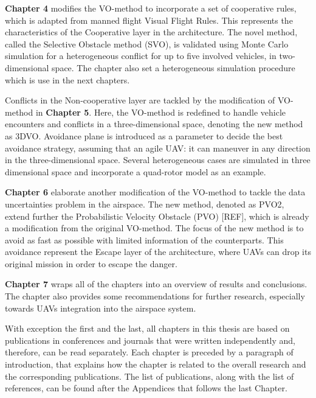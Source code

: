 \textbf{Chapter 4} modifies the VO-method to incorporate a set of cooperative rules, which is adapted from manned flight Visual Flight Rules. This represents the characteristics of the Cooperative layer in the architecture. The novel method, called the Selective Obstacle method (SVO), is validated using Monte Carlo simulation for a heterogeneous conflict for up to five involved vehicles, in two-dimensional space. The chapter also set a heterogeneous simulation procedure which is use in the next chapters.

Conflicts in the Non-cooperative layer are tackled by the modification of VO-method in \textbf{Chapter 5}. Here, the VO-method is redefined to handle vehicle encounters and conflicts in a three-dimensional space, denoting the new method as 3DVO. Avoidance plane is introduced as a parameter to decide the best avoidance strategy, assuming that an agile UAV: it can maneuver in any direction in the three-dimensional space. Several heterogeneous cases are simulated in three dimensional space and incorporate a quad-rotor model as an example.

\textbf{Chapter 6} elaborate another modification of the VO-method to tackle the data uncertainties problem in the airspace. The new method, denoted as PVO2, extend further the Probabilistic Velocity Obstacle (PVO) [REF], which is already a modification from the original VO-method. The focus of the new method is to avoid as fast as possible with limited information of the counterparts. This avoidance represent the Escape layer of the architecture, where UAVs can drop its original mission in order to escape the danger.

\textbf{Chapter 7} wraps all of the chapters into an overview of results and conclusions. The chapter also provides some recommendations for further research, especially towards UAVs integration into the airspace system.

With exception the first and the last, all chapters in this thesis are based on publications in conferences and journals that were written independently and, therefore, can be read separately. Each chapter is preceded by a paragraph of introduction, that explains how the chapter is related to the overall research and the corresponding publications. The list of publications, along with the list of references, can be found after the Appendices that follows the last Chapter.





